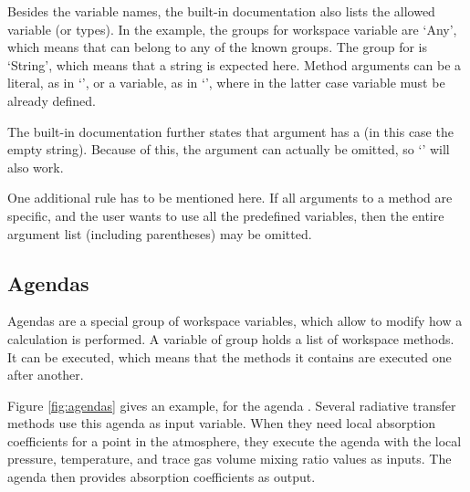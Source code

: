 Besides the variable names, the built-in documentation also lists the allowed
variable  (or types). In the example, the groups for workspace variable
 are `Any', which means that  can belong to any of the
known groups. The group for  is `String', which means that a
string is expected here. Method arguments can be a literal, as in
`', or a variable, as in
`', where in the latter case variable
 must be already defined.

The built-in documentation further states that argument
 has a  (in this case the
empty string). Because of this, the argument can actually be omitted,
so `' will also work.

One additional rule has to be mentioned here. If all arguments to a
method are specific, and the user wants to use all the predefined
variables, then the entire argument list (including parentheses) may
be omitted. 


\subsection{Agendas}
\label{sec:agendas}
%
Agendas are a special group of workspace variables, which allow to
modify how a calculation is performed. A variable of group
 holds a list of workspace methods. It can be
executed, which means that the methods it contains are executed one
after another.

Figure \ref{fig:agendas} gives an example, for the agenda
. Several radiative transfer methods use this
agenda as input variable. When they need local absorption coefficients for a
point in the atmosphere, they execute the agenda with the local pressure,
temperature, and trace gas volume mixing ratio values as inputs. The agenda
then provides absorption coefficients as output.

